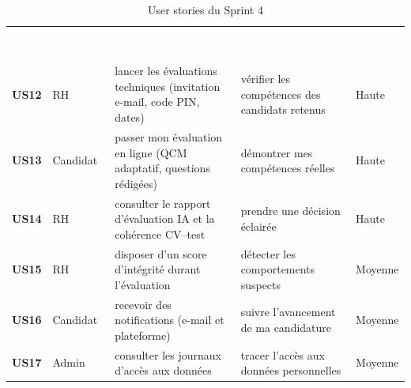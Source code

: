 \documentclass[12pt,a4paper]{report}
\begin{document}
\begin{table}[H]
\centering
\caption{User stories du Sprint 4}
\label{tab:backlog-s4}
\small
\begin{tabularx}{\textwidth}{>{\bfseries}p{0.9cm} p{1.9cm} X X p{1.4cm}}
\rowcolor{tabheader}
\textcolor{white}{\textbf{ID}} & \textcolor{white}{\textbf{En tant que\ldots}} & \textcolor{white}{\textbf{Je veux\ldots}} & \textcolor{white}{\textbf{Afin de\ldots}} & \textcolor{white}{\textbf{Priorité}} \\
US12 & RH & lancer les évaluations techniques (invitation e-mail, code PIN, dates) & vérifier les compétences des candidats retenus & Haute \\
\rowcolor{tabalt}
US13 & Candidat & passer mon évaluation en ligne (QCM adaptatif, questions rédigées) & démontrer mes compétences réelles & Haute \\
US14 & RH & consulter le rapport d'évaluation IA et la cohérence CV--test & prendre une décision éclairée & Haute \\
\rowcolor{tabalt}
US15 & RH & disposer d'un score d'intégrité durant l'évaluation & détecter les comportements suspects & Moyenne \\
US16 & Candidat & recevoir des notifications (e-mail et plateforme) & suivre l'avancement de ma candidature & Moyenne \\
\rowcolor{tabalt}
US17 & Admin & consulter les journaux d'accès aux données & tracer l'accès aux données personnelles & Moyenne \\
\bottomrule
\end{tabularx}
\end{table}
\end{document}
